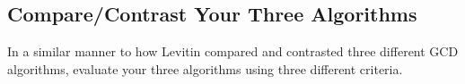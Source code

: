 \documentclass[12pt]{amsart}
\begin{document}
\subsection{Compare/Contrast Your Three Algorithms}
In a similar manner to how Levitin compared and contrasted three different GCD algorithms, evaluate your three algorithms using three different criteria.
\end{document}
